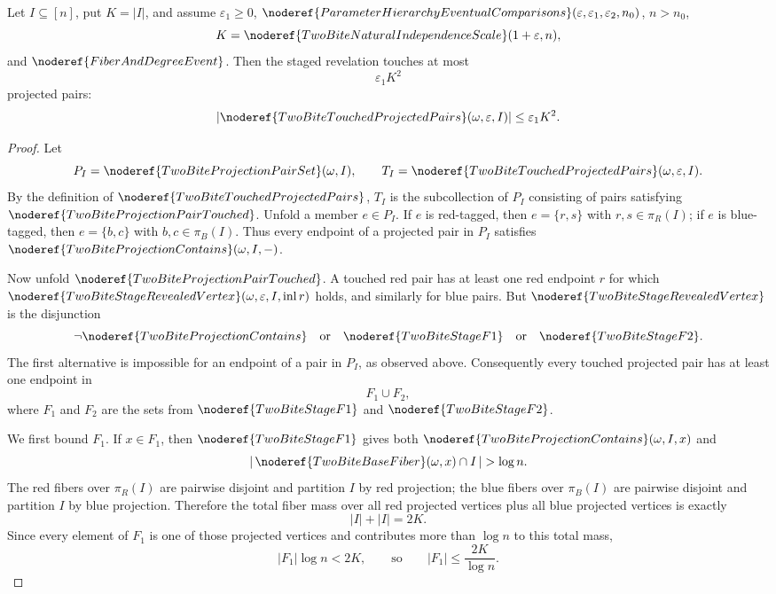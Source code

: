 \begin{lemma}
Let \(I\subseteq[n]\), put \(K=|I|\), and assume
\(\varepsilon_1\ge0\),
\(\noderef{ParameterHierarchyEventualComparisons}
(\varepsilon,\varepsilon_1,\varepsilon_2,n_0)\), \(n>n_0\),
\[
K=\noderef{TwoBiteNaturalIndependenceScale}(1+\varepsilon,n),
\]
and \(\noderef{FiberAndDegreeEvent}\).  Then the staged revelation touches at
most
\[
\varepsilon_1K^2
\]
projected pairs:
\[
|\noderef{TwoBiteTouchedProjectedPairs}(\omega,\varepsilon,I)|
\le \varepsilon_1K^2.
\]
\end{lemma}
\begin{proof}
Let
\[
P_I=\noderef{TwoBiteProjectionPairSet}(\omega,I),\qquad
T_I=\noderef{TwoBiteTouchedProjectedPairs}(\omega,\varepsilon,I).
\]
By the definition of \(\noderef{TwoBiteTouchedProjectedPairs}\), \(T_I\) is the
subcollection of \(P_I\) consisting of pairs satisfying
\(\noderef{TwoBiteProjectionPairTouched}\).  Unfold a member \(e\in P_I\).  If
\(e\) is red-tagged, then \(e=\{r,s\}\) with
\(r,s\in\pi_R(I)\); if \(e\) is blue-tagged, then
\(e=\{b,c\}\) with \(b,c\in\pi_B(I)\).  Thus every endpoint of a projected pair
in \(P_I\) satisfies \(\noderef{TwoBiteProjectionContains}(\omega,I,-)\).

Now unfold \(\noderef{TwoBiteProjectionPairTouched}\).  A touched red pair has
at least one red endpoint \(r\) for which
\(\noderef{TwoBiteStageRevealedVertex}(\omega,\varepsilon,I,\mathrm{inl}\,r)\)
holds, and similarly for blue pairs.  But
\(\noderef{TwoBiteStageRevealedVertex}\) is the disjunction
\[
\neg\noderef{TwoBiteProjectionContains}
\quad\text{or}\quad
\noderef{TwoBiteStageF1}
\quad\text{or}\quad
\noderef{TwoBiteStageF2}.
\]
The first alternative is impossible for an endpoint of a pair in \(P_I\), as
observed above.  Consequently every touched projected pair has at least one
endpoint in
\[
F_1\cup F_2,
\]
where \(F_1\) and \(F_2\) are the sets from
\(\noderef{TwoBiteStageF1}\) and \(\noderef{TwoBiteStageF2}\).

We first bound \(F_1\).  If \(x\in F_1\), then
\(\noderef{TwoBiteStageF1}\) gives both
\(\noderef{TwoBiteProjectionContains}(\omega,I,x)\) and
\[
|\,\noderef{TwoBiteBaseFiber}(\omega,x)\cap I\,|>\log n.
\]
The red fibers over \(\pi_R(I)\) are pairwise disjoint and partition \(I\) by
red projection; the blue fibers over \(\pi_B(I)\) are pairwise disjoint and
partition \(I\) by blue projection.  Therefore the total fiber mass over all red
projected vertices plus all blue projected vertices is exactly
\[
|I|+|I|=2K.
\]
Since every element of \(F_1\) is one of those projected vertices and contributes
more than \(\log n\) to this total mass,
\[
|F_1|\log n <2K,
\qquad\text{so}\qquad
|F_1|\le \frac{2K}{\log n}.
\]


\end{proof}
